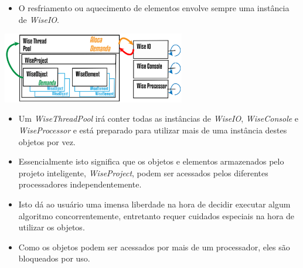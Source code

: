 \documentclass[10pt,aspectratio=169]{beamer}
\theoremstyle{remark}
\theoremstyle{definition}
\begin{document}
\begin{frame}[allowframebreaks]
	\framebreak
	
	\begin{itemize}
			\item O resfriamento ou aquecimento de elementos envolve sempre uma instância de \textit{WiseIO}.
	\end{itemize}		
	
	\begin{center}
		
		\item \includegraphics[width=0.6\textwidth]{Figures/WiseThreadPoolHeating@16x.png}
		
	\end{center}
	
	\framebreak
	
	\begin{itemize}
		\item Um \textit{WiseThreadPool} irá conter todas as instâncias de \textit{WiseIO}, \textit{WiseConsole} e \textit{WiseProcessor} e está preparado para utilizar mais de uma instância destes objetos por vez.
		\item Essencialmente isto significa que os objetos e elementos armazenados pelo projeto inteligente, \textit{WiseProject}, podem ser acessados pelos diferentes processadores independentemente.
		
		\item Isto dá ao usuário uma imensa liberdade na hora de decidir executar algum algoritmo concorrentemente, entretanto requer cuidados especiais na hora de utilizar os objetos.
		
		\item Como os objetos podem ser acessados por mais de um processador, eles são bloqueados por uso.
	\end{itemize}

\end{frame}
		
		
\end{document}
